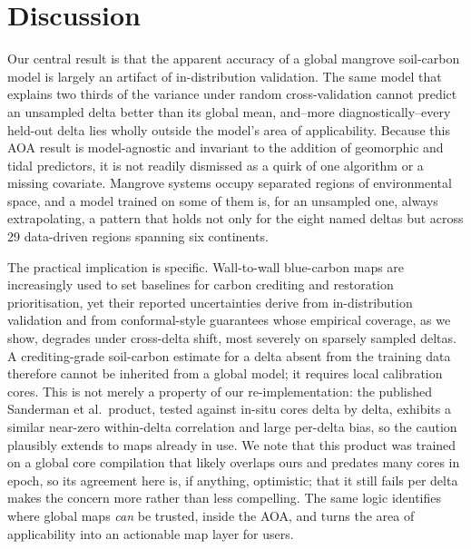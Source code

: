 \documentclass[twocolumn,9pt]{extarticle}
\begin{document}
\section*{Discussion}
Our central result is that the apparent accuracy of a global mangrove soil-carbon model
is largely an artifact of in-distribution validation. The same model that explains two
thirds of the variance under random cross-validation cannot predict an unsampled delta
better than its global mean, and--more diagnostically--every held-out delta lies wholly
outside the model's area of applicability. Because this AOA result is model-agnostic and
invariant to the addition of geomorphic and tidal predictors, it is not readily
dismissed as a quirk of one algorithm or a missing covariate. Mangrove systems
occupy separated regions of environmental space, and a model trained on some of them is,
for an unsampled one, always extrapolating, a pattern that holds not only for the eight
named deltas but across 29 data-driven regions spanning six continents.

The practical implication is specific. Wall-to-wall blue-carbon maps are increasingly
used to set baselines for carbon crediting and restoration prioritisation, yet their
reported uncertainties derive from in-distribution validation and from conformal-style
guarantees whose empirical coverage, as we show, degrades under cross-delta shift, most
severely on sparsely sampled deltas. A crediting-grade soil-carbon estimate for a delta
absent from the training data
therefore cannot be inherited from a global model; it requires local calibration cores.
This is not merely a property of our re-implementation: the published Sanderman et al.\
product, tested against in-situ cores delta by delta, exhibits a similar near-zero
within-delta correlation and large per-delta bias, so the caution plausibly extends to
maps already in use. We note that this product was trained on a global core compilation
that likely overlaps ours and predates many cores in epoch, so its agreement here is, if
anything, optimistic; that it still fails per delta makes the concern more rather than
less compelling.
The same logic identifies where global maps \emph{can} be trusted, inside the AOA, and turns the area of applicability into an actionable map layer for users.
\end{document}

